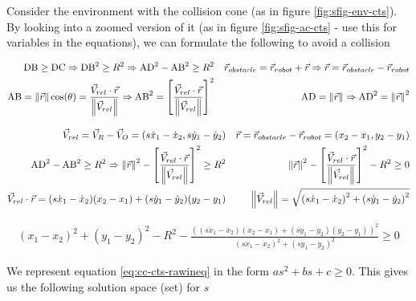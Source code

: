 Consider the environment with the collision cone (as in figure \ref{fig:sfig-env-cts}). By looking into a zoomed version of it (as in figure \ref{fig:sfig-ac-cts} - use this for variables in the equations), we can formulate the following to avoid a collision

\begin{align*}
    \textup{DB} \ge \textup{DC} \Rightarrow
    \textup{DB}^2 \ge R^2 \Rightarrow
    \textup{AD}^2 - \textup{AB}^2 \ge R^2
    &&
    \vec{r}_{obstacle} = \vec{r}_{robot} + \vec{r} \Rightarrow 
    \vec{r} = \vec{r}_{obstacle} - \vec{r}_{robot}
    \\
    \textup{AB} = \left \| \vec{r} \right \| \cos(\theta) = \frac{\vec{V}_{rel} \cdot \vec{r}}{\left \| \vec{V}_{rel} \right \|}
    \Rightarrow \textup{AB}^2 = \left [ \frac{\vec{V}_{rel} \cdot \vec{r}}{\left \| \vec{V}_{rel} \right \|} \right ]^2
    &&
    \textup{AD} = \left \| \vec{r} \right \| \Rightarrow \textup{AD}^2 = \left \| \vec{r} \right \|^2
\end{align*}

\begin{align*}
    \vec{V}_{rel} = \vec{V}_{R} - \vec{V}_{O} = (s\dot{x}_1 - \dot{x}_2, s\dot{y}_1 - \dot{y}_2)
    &&
    \vec{r} = \vec{r}_{obstacle} - \vec{r}_{robot} = (x_2 - x_1, y_2 - y_1) \\
    \textup{AD}^2 - \textup{AB}^2 \ge R^2 \Rightarrow 
    \left \| \vec{r} \right \|^2 - \left [ \frac{\vec{V}_{rel} \cdot \vec{r}}{\left \| \vec{V}_{rel} \right \|} \right ]^2 \ge R^2
    &&
    \left \| \vec{r} \right \|^2 - \left [ \frac{\vec{V}_{rel} \cdot \vec{r}}{\left \| \vec{V}_{rel} \right \|} \right ]^2 - R^2 \ge 0
    \\
    \vec{V}_{rel} \cdot \vec{r} = (s\dot{x}_1 - \dot{x}_2) (x_2 - x_1) + (s\dot{y}_1 - \dot{y}_2) (y_2 - y_1)
    &&
    \left \| \vec{V}_{rel} \right \| = \sqrt{\left( s\dot{x}_1 - \dot{x}_2 \right)^2 + \left( s\dot{y}_1 - \dot{y}_2 \right)^2}
\end{align*}

\begin{align}
    (x_1 - x_2)^2 + (y_1 - y_2)^2 - R^2 - \frac{\left( (s\dot{x}_1 - \dot{x}_2) (x_2 - x_1) + (s\dot{y}_1 - \dot{y}_2) (y_2 - y_1) \right)^2}{\left( s\dot{x}_1 - \dot{x}_2 \right)^2 + \left( s\dot{y}_1 - \dot{y}_2 \right)^2} \ge 0
    \label{eq:cc-cts-rawineq}
\end{align}

We represent equation \ref{eq:cc-cts-rawineq} in the form $a s^2 + b s + c \ge 0$. This gives us the following solution space (set) for $s$

